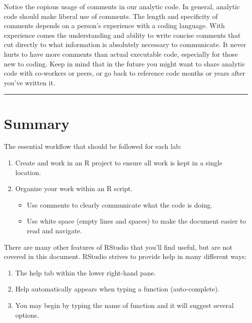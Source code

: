 \documentclass[]{book}
\providecommand{\tightlist}{%
  \setlength{\itemsep}{0pt}\setlength{\parskip}{0pt}}
\theoremstyle{definition}
\theoremstyle{definition}
\theoremstyle{definition}
\theoremstyle{remark}
\begin{document}
Notice the copious usage of comments in our analytic code. In general,
analytic code should make liberal use of comments. The length and
specificity of comments depends on a person's experience with a coding
language. With experience comes the understanding and ability to write
concise comments that cut directly to what information is absolutely
necessary to communicate. It never hurts to have more comments than
actual executable code, especially for those new to coding. Keep in mind
that in the future you might want to share analytic code with co-workers
or peers, or go back to reference code months or years after you've
written it.

\begin{center}\rule{0.5\linewidth}{\linethickness}\end{center}

\hypertarget{summary}{%
\section{Summary}\label{summary}}

The essential workflow that should be followed for each lab:

\begin{enumerate}
\def\labelenumi{\arabic{enumi}.}
\tightlist
\item
  Create and work in an R project to ensure all work is kept in a single
  location.
\item
  Organize your work within an R script.

  \begin{itemize}
  \tightlist
  \item
    Use comments to clearly communicate what the code is doing.
  \item
    Use white space (empty lines and spaces) to make the document easier
    to read and navigate.
  \end{itemize}
\end{enumerate}

There are many other features of RStudio that you'll find useful, but
are not covered in this document. RStudio strives to provide help in
many different ways:

\begin{enumerate}
\def\labelenumi{\arabic{enumi}.}
\tightlist
\item
  The help tab within the lower right-hand pane.
\item
  Help automatically appears when typing a function (auto-complete).
\item
  You may begin by typing the name of function and it will suggest
  several options.
\end{enumerate}
\end{document}
